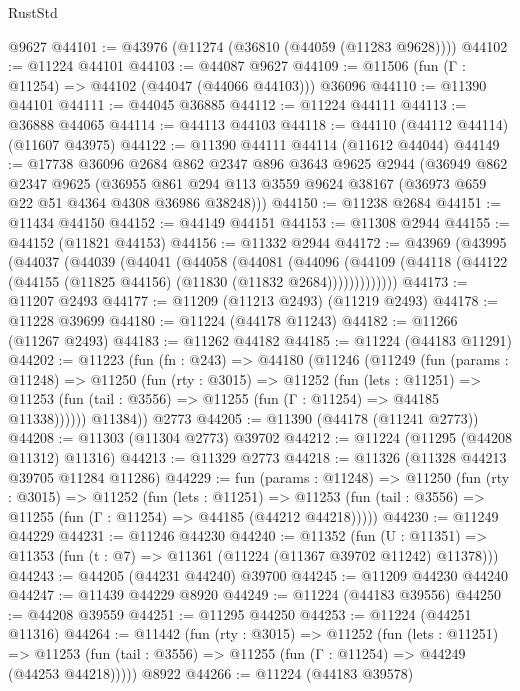 \begin{lexlean}{RustStd}
\begin{coremodule}
    @9627
@44101 := @43976 (@11274 (@36810 (@44059 (@11283 @9628))))
@44102 := @11224 @44101
@44103 := @44087 @9627
@44109 := @11506 (fun (Γ : @11254) => @44102 (@44047 (@44066 @44103))) @36096
@44110 := @11390 @44101
@44111 := @44045 @36885
@44112 := @11224 @44111
@44113 := @36888 @44065
@44114 := @44113 @44103
@44118 := @44110 (@44112 @44114) (@11607 @43975)
@44122 := @11390 @44111 @44114 (@11612 @44044)
@44149 := @17738
    @36096
    @2684
    @862
    @2347
    @896
    @3643
    @9625
    @2944
    (@36949
      @862
      @2347
      @9625
      (@36955 @861 @294 @113 @3559 @9624 @38167 (@36973 @659 @22 @51 @4364 @4308 @36986 @38248)))
@44150 := @11238 @2684
@44151 := @11434 @44150
@44152 := @44149 @44151
@44153 := @11308 @2944
@44155 := @44152 (@11821 @44153)
@44156 := @11332 @2944
@44172 := @43969
    (@43995
      (@44037
        (@44039
          (@44041
            (@44058
              (@44081
                (@44096
                  (@44109 (@44118 (@44122 (@44155 (@11825 @44156) (@11830 (@11832 @2684)))))))))))))
@44173 := @11207 @2493
@44177 := @11209 (@11213 @2493) (@11219 @2493)
@44178 := @11228 @39699
@44180 := @11224 (@44178 @11243)
@44182 := @11266 (@11267 @2493)
@44183 := @11262 @44182
@44185 := @11224 (@44183 @11291)
@44202 := @11223
    (fun (fn : @243) =>
    @44180
      (@11246
        (@11249
          (fun (params : @11248) =>
          @11250
            (fun (rty : @3015) =>
            @11252
              (fun (lets : @11251) =>
              @11253 (fun (tail : @3556) => @11255 (fun (Γ : @11254) => @44185 @11338))))))
        @11384))
    @2773
@44205 := @11390 (@44178 (@11241 @2773))
@44208 := @11303 (@11304 @2773) @39702
@44212 := @11224 (@11295 (@44208 @11312) @11316)
@44213 := @11329 @2773
@44218 := @11326 (@11328 @44213 @39705 @11284 @11286)
@44229 := fun (params : @11248) =>
  @11250
    (fun (rty : @3015) =>
    @11252
      (fun (lets : @11251) =>
      @11253 (fun (tail : @3556) => @11255 (fun (Γ : @11254) => @44185 (@44212 @44218)))))
@44230 := @11249 @44229
@44231 := @11246 @44230
@44240 := @11352
    (fun (U : @11351) => @11353 (fun (t : @7) => @11361 (@11224 (@11367 @39702 @11242) @11378)))
@44243 := @44205 (@44231 @44240) @39700
@44245 := @11209 @44230 @44240
@44247 := @11439 @44229 @8920
@44249 := @11224 (@44183 @39556)
@44250 := @44208 @39559
@44251 := @11295 @44250
@44253 := @11224 (@44251 @11316)
@44264 := @11442
    (fun (rty : @3015) =>
    @11252
      (fun (lets : @11251) =>
      @11253 (fun (tail : @3556) => @11255 (fun (Γ : @11254) => @44249 (@44253 @44218)))))
    @8922
@44266 := @11224 (@44183 @39578)

\end{coremodule}
\end{lexlean}
